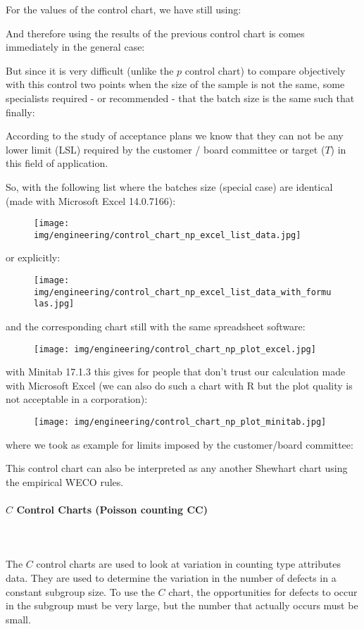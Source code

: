 	For the values of the control chart, we have still using:
	
	And therefore using the results of the previous control chart is comes immediately in the general case:
	
	But since it is very difficult (unlike the $p$ control chart) to compare objectively with this control two points when the size of the sample is not the same, some specialists required - or recommended - that the batch size is the same such that finally:
	 
	According to the study of acceptance plans we know that they can not be any lower limit (LSL) required by the customer / board committee or target ($T$) in this field of application.

	So, with the following list where the batches size (special case) are identical (made with Microsoft Excel 14.0.7166):
	\begin{figure}[H]
		\centering
		\texttt{[image: img/engineering/control\_chart\_np\_excel\_list\_data.jpg]}
	\end{figure}
	or explicitly:
	\begin{figure}[H]
		\centering
		\texttt{[image: img/engineering/control\_chart\_np\_excel\_list\_data\_with\_formulas.jpg]}
	\end{figure}
	and the corresponding chart still with the same spreadsheet software:
	\begin{figure}[H]
		\centering
		\texttt{[image: img/engineering/control\_chart\_np\_plot\_excel.jpg]}
	\end{figure}
	with Minitab 17.1.3 this gives for people that don't trust our calculation made with Microsoft Excel (we can also do such a chart with R but the plot quality is not acceptable in a corporation):	
	\begin{figure}[H]
		\centering
		\texttt{[image: img/engineering/control\_chart\_np\_plot\_minitab.jpg]}
	\end{figure}
	where we took as example for limits imposed by the customer/board committee:
	

	This control chart can also be interpreted as any another Shewhart chart using the empirical WECO rules.
	
	\paragraph{$C$ Control Charts (Poisson counting CC)}\mbox{}\\\\
	The $C$ control charts are used to look at variation in counting type attributes data. They are used to determine the variation in the number of defects in a constant subgroup size. To use the $C$ chart, the opportunities for defects to occur in the subgroup must be very large, but the number that actually occurs must be small. 
	
